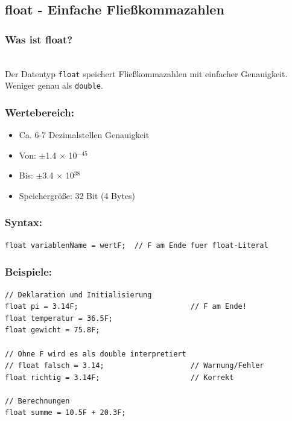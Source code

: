 \newpage


\subsection*{float - Einfache Fließkommazahlen}

\subsubsection*{Was ist float?}\\
Der Datentyp \texttt{float} speichert Fließkommazahlen mit einfacher Genauigkeit.
Weniger genau als \texttt{double}.

\subsubsection*{Wertebereich:}
\begin{itemize}
	\item Ca. 6-7 Dezimalstellen Genauigkeit
	\item Von: $\pm$1.4 $\times$ 10$^{-45}$
	\item Bis: $\pm$3.4 $\times$ 10$^{38}$
	\item Speichergröße: 32 Bit (4 Bytes)
\end{itemize}

\subsubsection*{Syntax:}
\begin{lstlisting}
float variablenName = wertF;  // F am Ende fuer float-Literal
\end{lstlisting}

\subsubsection*{Beispiele:}
\begin{lstlisting}
// Deklaration und Initialisierung
float pi = 3.14F;                          // F am Ende!
float temperatur = 36.5F;
float gewicht = 75.8F;

// Ohne F wird es als double interpretiert
// float falsch = 3.14;                    // Warnung/Fehler
float richtig = 3.14F;                     // Korrekt

// Berechnungen
float summe = 10.5F + 20.3F;
\end{lstlisting}

